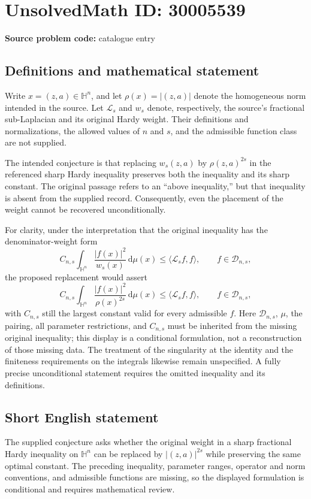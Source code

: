 \documentclass[11pt]{article}
\begin{document}
\section*{UnsolvedMath ID: 30005539}
\textbf{Source problem code:} catalogue entry
\subsection{Definitions and mathematical statement}
Write \(x=(z,a)\in\mathbb H^n\), and let \(\rho(x)=|(z,a)|\) denote the homogeneous norm intended in the source. Let \(\mathcal L_s\) and \(w_s\) denote, respectively, the source's fractional sub-Laplacian and its original Hardy weight. Their definitions and normalizations, the allowed values of \(n\) and \(s\), and the admissible function class are not supplied.

The intended conjecture is that replacing \(w_s(z,a)\) by \(\rho(z,a)^{2s}\) in the referenced sharp Hardy inequality preserves both the inequality and its sharp constant. The original passage refers to an ``above inequality,'' but that inequality is absent from the supplied record. Consequently, even the placement of the weight cannot be recovered unconditionally.

For clarity, under the interpretation that the original inequality has the denominator-weight form
\[
 C_{n,s}\int_{\mathbb H^n}\frac{|f(x)|^2}{w_s(x)}\,\mathrm d\mu(x)
 \leq \langle\mathcal L_s f,f\rangle,
 \qquad f\in\mathcal D_{n,s},
\]
the proposed replacement would assert
\[
 C_{n,s}\int_{\mathbb H^n}\frac{|f(x)|^2}{\rho(x)^{2s}}\,\mathrm d\mu(x)
 \leq \langle\mathcal L_s f,f\rangle,
 \qquad f\in\mathcal D_{n,s},
\]
with \(C_{n,s}\) still the largest constant valid for every admissible \(f\). Here \(\mathcal D_{n,s}\), \(\mu\), the pairing, all parameter restrictions, and \(C_{n,s}\) must be inherited from the missing original inequality; this display is a conditional formulation, not a reconstruction of those missing data. The treatment of the singularity at the identity and the finiteness requirements on the integrals likewise remain unspecified. A fully precise unconditional statement requires the omitted inequality and its definitions.
\subsection{Short English statement}
The supplied conjecture asks whether the original weight in a sharp fractional Hardy inequality on \(\mathbb H^n\) can be replaced by \(|(z,a)|^{2s}\) while preserving the same optimal constant. The preceding inequality, parameter ranges, operator and norm conventions, and admissible functions are missing, so the displayed formulation is conditional and requires mathematical review.
\end{document}
